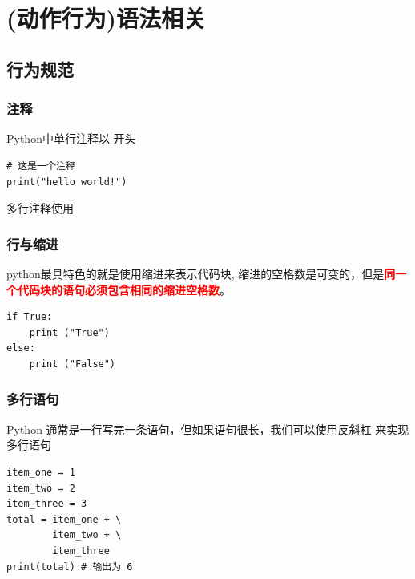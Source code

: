 \chapter{(动作行为)语法相关}

\section{行为规范}
\subsection{注释}
Python中单行注释以 \codeinline{\#} 开头
\begin{lstlisting}[style=pythonstyle]
# 这是一个注释
print("hello world!")
\end{lstlisting}

多行注释使用

\subsection{行与缩进}
python最具特色的就是使用缩进来表示代码块,
缩进的空格数是可变的，但是\textcolor{red}{\textbf{同一个代码块的语句必须包含相同的缩进空格数}}。
\begin{lstlisting}[style=pythonstyle]
if True:
    print ("True")
else:
    print ("False")
\end{lstlisting}    

\subsection{多行语句}
Python 通常是一行写完一条语句，但如果语句很长，我们可以使用反斜杠 \codeinline{\textbackslash} 来实现多行语句
\begin{lstlisting}[style=pythonstyle]
item_one = 1
item_two = 2
item_three = 3
total = item_one + \
        item_two + \
        item_three
print(total) # 输出为 6
\end{lstlisting}  

